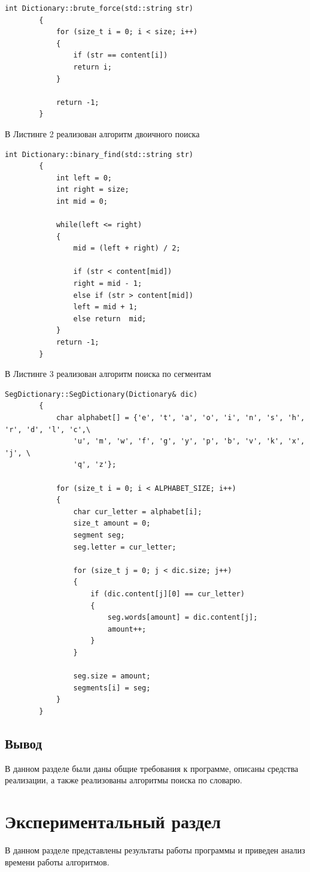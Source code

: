 \documentclass[14pt, a4paper]{extarticle}
\begin{document}
	\begin{lstlisting}[caption=Алгоритм полного перебора слов]
		int Dictionary::brute_force(std::string str)
		{
			for (size_t i = 0; i < size; i++)
			{
				if (str == content[i])
				return i;
			}
			
			return -1;
		}	
	\end{lstlisting}
	
	В Листинге 2 реализован алгоритм двоичного поиска
	
	\begin{lstlisting}[caption=Алгоритм двоичного поиска]
		int Dictionary::binary_find(std::string str)
		{
			int left = 0;
			int right = size;
			int mid = 0;
			
			while(left <= right)
			{
				mid = (left + right) / 2;
				
				if (str < content[mid])
				right = mid - 1;
				else if (str > content[mid])
				left = mid + 1;
				else return  mid;
			}
			return -1;
		}		
	\end{lstlisting}
	
	В Листинге 3 реализован алгоритм поиска по сегментам
	
	\begin{lstlisting}[caption=Алгоритм поиска по сегментам]
		SegDictionary::SegDictionary(Dictionary& dic)
		{
			char alphabet[] = {'e', 't', 'a', 'o', 'i', 'n', 's', 'h', 'r', 'd', 'l', 'c',\
				'u', 'm', 'w', 'f', 'g', 'y', 'p', 'b', 'v', 'k', 'x', 'j', \
				'q', 'z'};
			
			for (size_t i = 0; i < ALPHABET_SIZE; i++)
			{
				char cur_letter = alphabet[i];
				size_t amount = 0;
				segment seg;
				seg.letter = cur_letter;
				
				for (size_t j = 0; j < dic.size; j++)
				{
					if (dic.content[j][0] == cur_letter)
					{
						seg.words[amount] = dic.content[j];
						amount++;
					}
				}
				
				seg.size = amount;
				segments[i] = seg;
			}
		}
	\end{lstlisting}

	\subsection*{Вывод}
	В данном разделе были даны общие требования к программе, описаны средства реализации, а также реализованы алгоритмы поиска по словарю.
	
	
	\section{Экспериментальный раздел}
	В данном разделе представлены результаты работы программы и приведен анализ времени работы алгоритмов.
	
\end{document}
